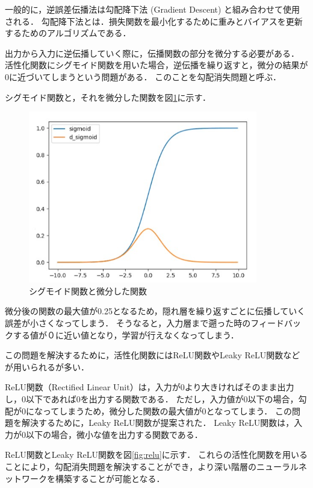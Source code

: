 \documentclass[a4j,12pt,dvipdfmx]{jreport}
\begin{document}
一般的に，逆誤差伝播法は勾配降下法 (Gradient Descent) と組み合わせて使用される．
勾配降下法とは．損失関数を最小化するために重みとバイアスを更新するためのアルゴリズムである．

出力から入力に逆伝播していく際に，伝播関数の部分を微分する必要がある．
活性化関数にシグモイド関数を用いた場合，逆伝播を繰り返すと，微分の結果が0に近づいてしまうという問題がある．
このことを勾配消失問題と呼ぶ．

シグモイド関数と，それを微分した関数を図\ref{fig:sigmoid}に示す．

\begin{figure}[t]
  \centering
  \includegraphics[width=10cm]{image/sigmoid.jpg}
  \caption{シグモイド関数と微分した関数}
  \label{fig:sigmoid}
\end{figure}

微分後の関数の最大値が0.25となるため，隠れ層を繰り返すごとに伝播していく誤差が小さくなってしまう．
そうなると，入力層まで遡った時のフィードバックする値が０に近い値となり，学習が行えなくなってしまう．

この問題を解決するために，活性化関数にはReLU関数やLeaky ReLU関数などが用いられるが多い．

ReLU関数（Rectified Linear Unit）は，入力が0より大きければそのまま出力し，0以下であれば0を出力する関数である．
ただし，入力値が0以下の場合，勾配が0になってしまうため，微分した関数の最大値が0となってしまう．
この問題を解決するために，Leaky ReLU関数が提案された．
Leaky ReLU関数は，入力が0以下の場合，微小な値を出力する関数である．

ReLU関数とLeaky ReLU関数を図\ref{fig:relu}に示す．
これらの活性化関数を用いることにより，勾配消失問題を解決することができ，より深い階層のニューラルネットワークを構築することが可能となる．
\end{document}
